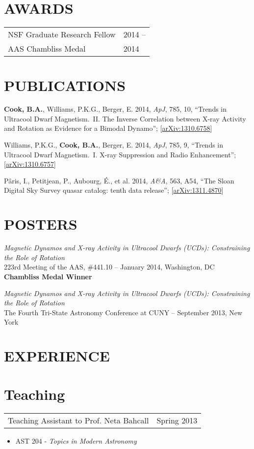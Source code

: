 \documentclass[margin]{res}
\begin{document}
\begin{resume}
\section{AWARDS}
\begin{tabular}{ll}
NSF Graduate Research Fellow & 2014 -- \\
AAS Chambliss Medal & 2014
\end{tabular}

\section{PUBLICATIONS}

\textbf{Cook, B.A.}, Williams, P.K.G., Berger, E. 2014, \textit{ApJ},
785, 10, ``Trends in Ultracool Dwarf Magnetism.~II. The Inverse
Correlation between X-ray Activity and Rotation as Evidence for a
Bimodal Dynamo'';
[\href{http://arxiv.org/abs/1310.6758}{arXiv:1310.6758}]

Williams, P.K.G., \textbf{Cook, B.A.}, Berger, E. 2014, \textit{ApJ},
785, 9, ``Trends in Ultracool Dwarf Magnetism.~I. X-ray Suppression
and Radio Enhancement'';
[\href{http://arxiv.org/abs/1310.6757}{arXiv:1310.6757}]

P\^{a}ris, I., Petitjean, P., Aubourg, \'E., et al. 2014,
\textit{A\&A}, 563, A54, ``The Sloan Digital Sky Survey quasar
catalog: tenth data release''; [\href{http://arxiv.org/abs/1311.4870}{arXiv:1311.4870}]

\section{POSTERS}

\textit{Magnetic Dynamos and X-ray Activity in Ultracool Dwarfs (UCDs):
Constraining the Role of Rotation}\\ 223rd Meeting of the AAS,
\#441.10 -- January 2014, Washington, DC \\ \textbf{Chambliss Medal
  Winner}

\textit{Magnetic Dynamos and X-ray Activity in Ultracool Dwarfs
  (UCDs): Constraining the Role of Rotation}\\ The Fourth Tri-State
Astronomy Conference at CUNY -- September 2013, New York

\section{EXPERIENCE}      
\normalsize{\section{Teaching}}
\begin{tabular}{@{}p{4in} r}
  Teaching Assistant to Prof. Neta Bahcall & Spring 2013
\end{tabular}
\begin{itemize}
\item[] AST 204 - \textit{Topics in Modern Astronomy}
\end{itemize}


\end{resume}
\end{document}
